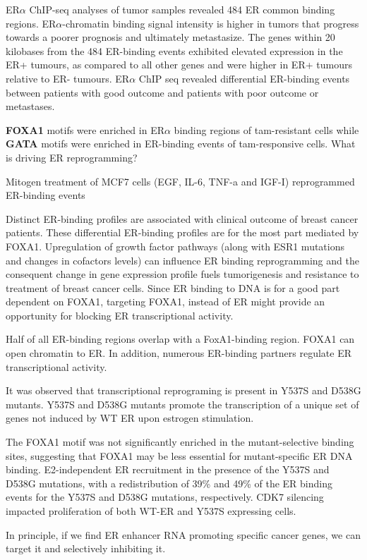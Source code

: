 ER$\alpha$ ChIP-seq analyses of tumor samples revealed 484 ER common binding regions. ER$\alpha$-chromatin binding signal intensity is higher in tumors that progress towards a poorer prognosis and ultimately metastasize. The genes within 20 kilobases from the 484 ER-binding events exhibited elevated expression in the ER+ tumours, as compared to all other genes and were higher in ER+ tumours relative to ER- tumours. ER$\alpha$ ChIP seq revealed differential ER-binding events between patients with good outcome and patients with poor outcome or metastases.

\textbf{FOXA1} motifs were enriched in ER$\alpha$ binding regions of tam-resistant cells while \textbf{GATA} motifs were enriched in ER-binding events of tam-responsive cells. What is driving ER reprogramming?

Mitogen treatment of MCF7 cells (EGF, IL-6, TNF-a and IGF-I) reprogrammed ER-binding events

Distinct ER-binding profiles are associated with clinical outcome of breast cancer patients. These differential ER-binding profiles are for the most part mediated by FOXA1. Upregulation of growth factor pathways (along with ESR1 mutations and changes in cofactors levels) can influence ER binding reprogramming and the consequent change in gene expression profile fuels tumorigenesis and resistance to treatment of breast cancer cells. Since ER binding to DNA is for a good part dependent on FOXA1, targeting FOXA1, instead of ER might provide an opportunity for blocking ER transcriptional activity.

Half of all ER-binding regions overlap with a FoxA1-binding region. FOXA1 can open chromatin to ER. In addition, numerous ER-binding partners regulate ER transcriptional activity.

It was observed that transcriptional reprograming is present in Y537S and D538G mutants. Y537S and D538G mutants promote the transcription of a unique set of genes not induced by WT ER upon estrogen stimulation.

The FOXA1 motif was not significantly enriched in the mutant-selective binding sites, suggesting that FOXA1 may be less essential for mutant-specific ER DNA binding. E2-independent ER recruitment in the presence of the Y537S and D538G mutations, with a redistribution of 39\% and 49\% of the ER binding events for the Y537S and D538G mutations, respectively. CDK7 silencing impacted proliferation of both WT-ER and Y537S expressing cells.

In principle, if we find ER enhancer RNA promoting specific cancer genes, we can target it and selectively inhibiting it.
